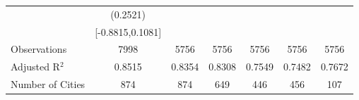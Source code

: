 \documentclass{article}
\begin{document}
\begin{table}[htbp]
\begin{tabular}{l*{6}{c}}
                    &    (0.2521)   &               &               &               &               &               \\
                    &[-0.8815,0.1081]   &               &               &               &               &               \\
\midrule
Observations        &        7998   &        5756   &        5756   &        5756   &        5756   &        5756   \\
Adjusted R$^2$      &      0.8515   &      0.8354   &      0.8308   &      0.7549   &      0.7482   &      0.7672   \\
Number of Cities    &         874   &         874   &         649   &         446   &         456   &         107   \\
\bottomrule
\end{tabular}
\end{table}
\end{document}
